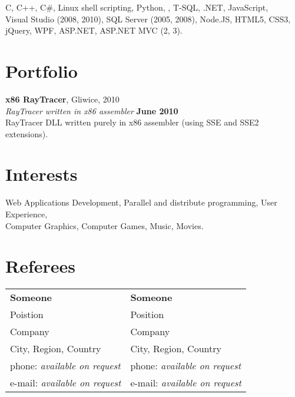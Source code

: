 \documentclass[margin,line]{resume}
\begin{document}
\begin{resume}
    C, C++, C\#, Linux shell scripting, Python, \LaTeXe, T-SQL, .NET, JavaScript, \\
    Visual Studio (2008, 2010), SQL Server (2005, 2008), Node.JS, HTML5, CSS3, \\
    jQuery, WPF, ASP.NET, ASP.NET MVC (2, 3).

    \section{\mysidestyle Portfolio} 

    \textbf{x86 RayTracer}, Gliwice, 2010 \vspace{2mm}\\\vspace{1mm}%
    \textsl{RayTracer written in x86 assembler} \hfill \textbf{June 2010}\\
    RayTracer DLL written purely in x86 assembler (using SSE and SSE2 extensions).

    \section{\mysidestyle Interests}

    Web Applications Development, Parallel and distribute programming, User Experience, \\
    Computer Graphics, Computer Games, Music, Movies.

\section{\mysidestyle Referees} 

\begin{tabular}{@{}p{6cm}p{6cm}}
\textbf{Someone}          &  \textbf{Someone}                  \\
Poistion                      &  Position                                      \\
Company       &  Company                        \\
City, Region, Country                &  City, Region, Country                 \\
phone: \textsl{available on request}    &  phone: \textsl{available on request}     \\
e-mail: \textsl{available on request}   &  e-mail: \textsl{available on request}    \\
\end{tabular}

\end{resume}
\end{document}
